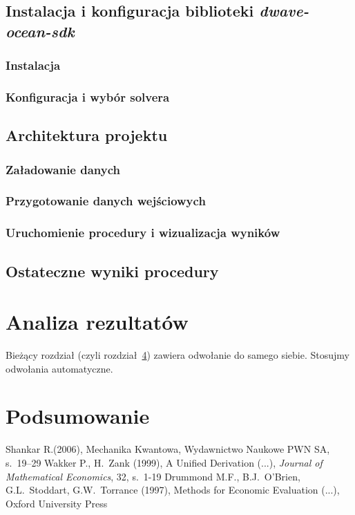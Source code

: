 \documentclass[12pt,a4paper,twoside,openany]{book}
\begin{document}
\section{Instalacja i konfiguracja biblioteki \textit{dwave-ocean-sdk}}
\subsection{Instalacja}

\subsection{Konfiguracja i wybór solvera}

\section{Architektura projektu}

\subsection{Załadowanie danych}

\subsection{Przygotowanie danych wejściowych}

\subsection{Uruchomienie procedury i wizualizacja wyników}

\section{Ostateczne wyniki procedury}

\chapter{Analiza rezultatów}
\label{sec:nast}

Bieżący rozdział (czyli rozdział~\ref{sec:nast}) zawiera odwołanie do samego siebie. Stosujmy odwołania automatyczne.

\clearpage

\chapter{Podsumowanie}

\clearpage
{}
\begin{thebibliography}{99}
\setlength{\itemsep}{0pt}%
 Shankar R.(2006), Mechanika Kwantowa, Wydawnictwo Naukowe PWN SA, s.~19--29
 Wakker P., H.~Zank (1999), A Unified Derivation (...), \textit{Journal of  Mathematical Economics}, 32, s.~1-19
 Drummond M.F., B.J.~O'Brien, G.L.~Stoddart, G.W.~Torrance (1997), Methods for Economic Evaluation (...), Oxford University Press
\end{thebibliography}
\end{document}
